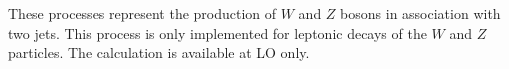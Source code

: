 These processes represent the production of $W$ and $Z$
bosons in association with two jets.
This process is only implemented for leptonic decays of the
$W$ and $Z$ particles. The calculation is available at LO only.


